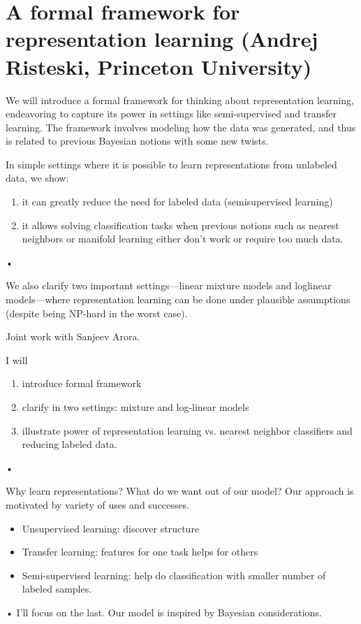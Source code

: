 \section{A formal framework for representation learning (Andrej Risteski, Princeton University)}

We will introduce a formal framework for thinking about representation learning, endeavoring to capture its power in settings like semi-supervised
and transfer learning. The framework involves modeling how the data was generated, and thus is related to previous Bayesian notions with some new twists.
 
In simple settings where it is possible to learn representations from unlabeled data, we show: 
\begin{enumerate}
\item
it can greatly reduce the need for labeled data (semisupervised learning)
\item 
it allows solving classification tasks when previous notions such as nearest neighbors or manifold learning either don't work or require too much data.
\end{enumerate}•
 
We also clarify two important settings---linear mixture models and loglinear models---where representation learning can be done under plausible assumptions (despite being NP-hard in the worst case). 
 
Joint work with Sanjeev Arora. 

I will 
\begin{enumerate}
\item
introduce formal framework
\item
clarify in two settings: mixture and log-linear models
\item
illustrate power of representation learning vs. nearest neighbor classifiers and reducing labeled data.
\end{enumerate}•


Why learn representations? What do we want out of our model? Our approach is motivated by variety of uses and successes. 
\begin{itemize}
\item
Unsupervised learning: discover structure
\item
Transfer learning: features for one task helps for others
\item
Semi-supervised learning: help do classification with smaller number of labeled samples.
\end{itemize}•
I'll focus on the last. Our model is inspired by Bayesian considerations.

